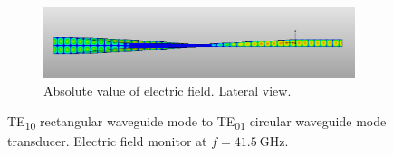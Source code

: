 \documentclass[english,twoside]{article}
\begin{document}
\begin{landscape}
\begin{figure}
\begin{subfigure}[b]{0.45\textwidth}
			\end{subfigure}
			\vspace{10pt}\newline
			~
			\begin{subfigure}[b]{.8\textwidth}
				\includegraphics[width=\textwidth]{figures/marie_lateral}
				\caption{Absolute value of electric field. Lateral view.}
			\end{subfigure}
			\caption{TE\textsubscript{10} rectangular waveguide mode to TE\textsubscript{01} circular waveguide mode transducer. Electric field monitor at $f=\SI{41.5}{\giga\hertz}$.}
		\end{figure}
	\end{landscape}
\end{document}
